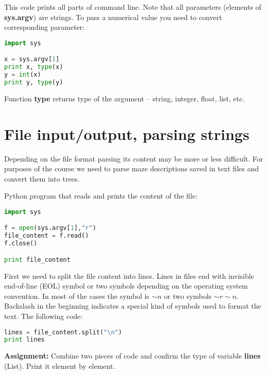 This code prints all parts of command line. Note that all 
parameters (elements of \textbf{sys.argv}) are strings.
To pass a numerical value you need to convert corresponding parameter:

\begin{lstlisting}[language=Python,style=codelst2,caption={Python: numbers in command line}]
import sys

x = sys.argv[1]
print x, type(x)
y = int(x)
print y, type(y)
\end{lstlisting}

Function \textbf{type} returns type of the argument --
string, integer, float, list, etc.


\section{File input/output, parsing strings}

Depending on the file format parsing its content 
may be more or less difficult.
For purposes of the course we need to parse maze descriptions 
saved in text files and convert them into trees.

Python program that reads and prints the content of the file:

\newpage

\begin{lstlisting}[language=Python,style=codelst2,caption={Reading file and printing its content}]
import sys

f = open(sys.argv[1],"r")
file_content = f.read()
f.close()

print file_content
\end{lstlisting}

First we need to split the file content into lines. Lines in files
end with invisible end-of-line (EOL) symbol or two 
symbols depending on the
operating system convention. In most of the cases
the symbol is \textbf{$\sim n$} or two symbols \textbf{$\sim r\sim n$}.
Backslash in the beginning indicates a special
kind of symbols used to format the text. The following code:

\begin{lstlisting}[language=Python,style=codelst2,caption={Splitting file into strings}]
lines = file_content.split("\n")
print lines
\end{lstlisting}

\begin{tcolorbox}
\textbf{Assignment:}
Combine two pieces of code and confirm the type of 
variable \textbf{lines} (List).
Print it element by element.
\end{tcolorbox}

